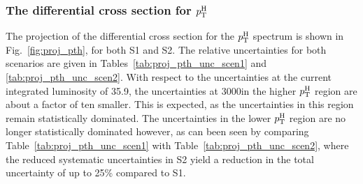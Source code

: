 \subsubsection{The differential cross section for \texorpdfstring{$p_\mathrm{T}^\mathrm{H}$}{pTH}}

The projection of the differential cross section for the $p_\mathrm{T}^\mathrm{H}$ spectrum is shown in Fig.~\ref{fig:proj_pth}, for both S1 and S2.
% 
The relative uncertainties for both scenarios are given in Tables~\ref{tab:proj_pth_unc_scen1} and \ref{tab:proj_pth_unc_scen2}.
% 
With respect to the uncertainties at the current integrated luminosity of 35.9\fbinv, the uncertainties at 3000\fbinv in the higher $p_\mathrm{T}^\mathrm{H}$ region are about a factor of ten smaller. This is expected, as the uncertainties in this region remain statistically dominated.
% 
The uncertainties in the lower $p_\mathrm{T}^\mathrm{H}$ region are no longer statistically dominated however, as can been seen by comparing Table~\ref{tab:proj_pth_unc_scen1} with Table~\ref{tab:proj_pth_unc_scen2}, where the reduced systematic uncertainties in S2 yield a reduction in the total uncertainty of up to 25\% compared to S1.


